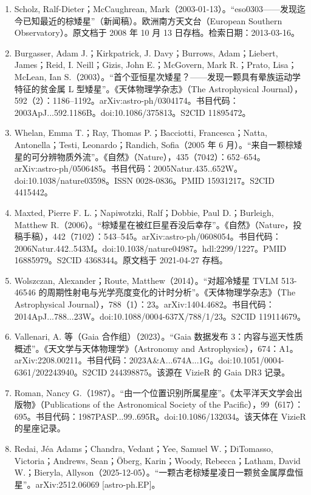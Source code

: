 \begin{enumerate}
\item Scholz, Ralf-Dieter；McCaughrean, Mark（2003-01-13）。“eso0303——发现迄今已知最近的棕矮星”（新闻稿）。欧洲南方天文台（European Southern Observatory）。原文档于 2008 年 10 月 13 日存档。检索日期：2013-03-16。
\item Burgasser, Adam J.；Kirkpatrick, J. Davy；Burrows, Adam；Liebert, James；Reid, I. Neill；Gizis, John E.；McGovern, Mark R.；Prato, Lisa；McLean, Ian S.（2003）。“首个亚恒星次矮星？——发现一颗具有晕族运动学特征的贫金属 L 型矮星”。《天体物理学杂志》（The Astrophysical Journal），592（2）：1186–1192。arXiv:astro-ph/0304174。书目代码：2003ApJ...592.1186B。doi:10.1086/375813。S2CID 11895472。
\item Whelan, Emma T.；Ray, Thomas P.；Bacciotti, Francesca；Natta, Antonella；Testi, Leonardo；Randich, Sofia（2005 年 6 月）。“来自一颗棕矮星的可分辨物质外流”。《自然》（Nature），435（7042）：652–654。arXiv:astro-ph/0506485。书目代码：2005Natur.435..652W。doi:10.1038/nature03598。ISSN 0028-0836。PMID 15931217。S2CID 4415442。
\item Maxted, Pierre F. L.；Napiwotzki, Ralf；Dobbie, Paul D.；Burleigh, Matthew R.（2006）。“棕矮星在被红巨星吞没后幸存”。《自然》（Nature，投稿手稿），442（7102）：543–545。arXiv:astro-ph/0608054。书目代码：2006Natur.442..543M。doi:10.1038/nature04987。hdl:2299/1227。PMID 16885979。S2CID 4368344。原文档于 2021-04-27 存档。
\item Wolszczan, Alexander；Route, Matthew（2014）。“对超冷矮星 TVLM 513-46546 的周期性射电与光学亮度变化的计时分析”。《天体物理学杂志》（The Astrophysical Journal），788（1）：23。arXiv:1404.4682。书目代码：2014ApJ...788...23W。doi:10.1088/0004-637X/788/1/23。S2CID 119114679。
\item Vallenari, A. 等（Gaia 合作组）（2023）。“Gaia 数据发布 3：内容与巡天性质概述”。《天文学与天体物理学》（Astronomy and Astrophysics），674：A1。arXiv:2208.00211。书目代码：2023A&A...674A...1G。doi:10.1051/0004-6361/202243940。S2CID 244398875。该源在 VizieR 的 Gaia DR3 记录。
\item Roman, Nancy G.（1987）。“由一个位置识别所属星座”。《太平洋天文学会出版物》（Publications of the Astronomical Society of the Pacific），99（617）：695。书目代码：1987PASP...99..695R。doi:10.1086/132034。该天体在 VizieR 的星座记录。
\item Redai, Jéa Adams；Chandra, Vedant；Yee, Samuel W.；DiTomasso, Victoria；Andrews, Sean；Öberg, Karin；Woody, Rebecca；Latham, David W.；Bieryla, Allyson（2025-12-05）。“一颗古老棕矮星凌日一颗贫金属厚盘恒星”。arXiv:2512.06069 [astro-ph.EP]。

\end{enumerate}
